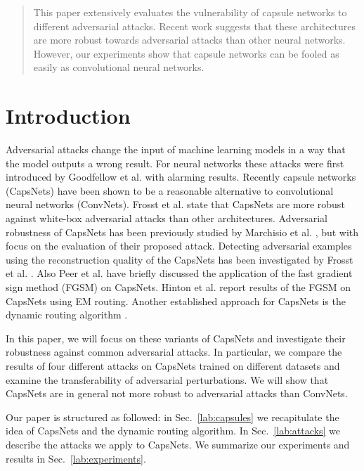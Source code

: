 \documentclass{article}
\begin{document}
\begin{abstract}
	This paper extensively evaluates the vulnerability of capsule networks to different adversarial attacks. Recent work suggests that these architectures are more robust towards adversarial attacks than other neural networks. However, our experiments show that capsule networks can be fooled as easily as convolutional neural networks.
\end{abstract}

\section{Introduction}
Adversarial attacks change the input of machine learning models in a
way that the model outputs a wrong result. For neural networks these
attacks were first introduced by Goodfellow et al.  with
alarming results. Recently capsule networks (CapsNets) \cite{capsules}
have been shown to be a reasonable alternative to convolutional neural
networks (ConvNets). Frosst et al.  state that CapsNets
are more robust against white-box adversarial attacks than other
architectures. Adversarial robustness of CapsNets has been previously
studied by Marchisio et al. , but with focus on the
evaluation of their proposed attack. Detecting adversarial examples
using the reconstruction quality of the CapsNets has been investigated
by Frosst et al. . Also Peer et al. 
have briefly discussed the application of the fast gradient sign
method (FGSM) \cite{fgsm} on CapsNets. Hinton et al. 
report results of the FGSM on CapsNets using EM routing.  Another
established approach for CapsNets is the dynamic routing algorithm
\cite{capsules}.

In this paper, we will focus on these variants of CapsNets and
investigate their robustness against common adversarial attacks.  In
particular, we compare the results of four different attacks on
CapsNets trained on different datasets and examine the transferability
of adversarial perturbations. We will show that CapsNets are in
general not more robust to adversarial attacks than ConvNets.

Our paper is structured as followed: in Sec.~\ref{lab:capsules} we
recapitulate the idea of CapsNets and the dynamic routing algorithm. In Sec.~\ref{lab:attacks} we describe the attacks
we apply to CapsNets. We summarize our experiments and results in  Sec.~\ref{lab:experiments}.
\end{document}
